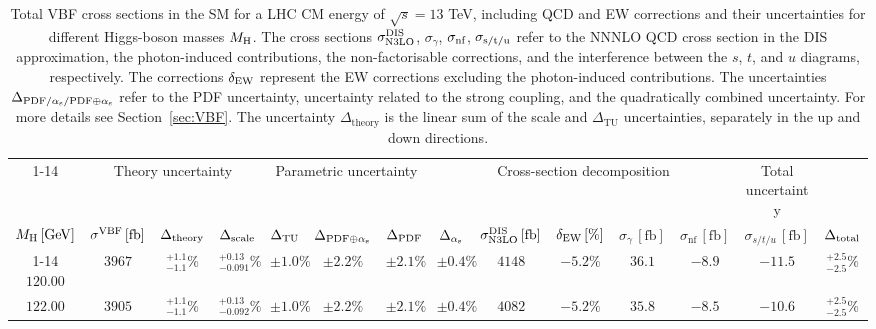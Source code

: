 \begin{landscape}
\begin{table}[ht!]
\caption{Total VBF cross sections in the SM for a LHC CM energy of $\sqrt{s}=13$ TeV, including QCD and EW corrections
and their uncertainties for different Higgs-boson masses \texorpdfstring{$M_\mathrm{H}$}\MH. 
The cross sections $\sigma_{\mathrm{N3LO}}^{\mathrm{DIS}}$, $\sigma_{\gamma}$, $\sigma_{\mbox{\scriptsize nf}}$, $\sigma_{\mbox{\scriptsize s/t/u}}$ refer to the NNNLO QCD cross section in the DIS approximation, the photon-induced contributions, the non-factorisable corrections, and the interference between the $s$, $t$, and $u$ diagrams, respectively.
The corrections $\delta_{\mathrm{EW}}$ represent the EW corrections excluding the photon-induced contributions.
The uncertainties $\Delta_{\mathrm{PDF}/\alpha_{\mathrm{s}}/\mathrm{PDF\oplus\alpha_{\mathrm{s}}}}$ refer to the PDF uncertainty, uncertainty related to the strong coupling, and the quadratically combined uncertainty.
For more details see Section~\ref{sec:VBF}. The uncertainty $\Delta_{\mathrm{theory}}$ is the linear sum of the scale and $\Delta_{\mathrm{TU}}$ uncertainties, separately in the up and down directions.}
\label{tab:vbf_XStot_13}
\centering
\scriptsize
{\renewcommand{\arraystretch}{1.4}
\begin{tabular}{| cc | ccc | ccc | ccc | cc | c |}
\cline{1-14}
\multicolumn{2}{|c|}{\(\sqrt{s} = 13\,\mathrm{TeV}\)} &
\multicolumn{3}{|c|}{Theory uncertainty} &
\multicolumn{3}{|c|}{Parametric uncertainty} &
\multicolumn{5}{|c|}{Cross-section decomposition} &
\multicolumn{1}{c|}{Total uncertainty} \\
\(M_\mathrm{H}\,[\mathrm{GeV}]\) & \(\sigma^{\mathrm{VBF}}\,[\mathrm{fb}]\) &
\(\Delta_{\rm theory}\) &
{\color{black!55}\(\Delta_{\rm scale}\)} & {\color{black!55}\(\Delta_{\rm TU}\)} &
\(\Delta_{\rm PDF\oplus\alpha_{\mathrm{s}}}\) &
{\color{black!55}\(\Delta_{\rm PDF}\)} & {\color{black!55}\(\Delta_{\alpha_{\mathrm{s}}}\)} &
\(\sigma_{\mathrm{N3LO}}^{\mathrm{DIS}}\,[\mathrm{fb}]\) & \(\delta_{\mathrm{EW}}\,[\%]\) & \(\sigma_\gamma\,[\mathrm{fb}]\) & \(\sigma_{\mathrm{nf}}\,[\mathrm{fb}]\) & \(\sigma_{s/t/u}\,[\mathrm{fb}]\) &
\(\Delta_{\rm total}\)
\\
\cline{1-14}
$120.00$ & $3967$ & $^{+1.1}_{-1.1}\%$ & {\color{black!55}$^{+0.13}_{-0.091}\%$} & {\color{black!55}$\pm 1.0\%$} & $\pm 2.2\%$ & {\color{black!55}$\pm 2.1\%$} & {\color{black!55}$\pm 0.4\%$} & $4148$ & $-5.2\%$ & $36.1$ & $-8.9$ & $-11.5$ & $^{+2.5}_{-2.5}\%$ \\
$122.00$ & $3905$ & $^{+1.1}_{-1.1}\%$ & {\color{black!55}$^{+0.13}_{-0.092}\%$} & {\color{black!55}$\pm 1.0\%$} & $\pm 2.2\%$ & {\color{black!55}$\pm 2.1\%$} & {\color{black!55}$\pm 0.4\%$} & $4082$ & $-5.2\%$ & $35.8$ & $-8.5$ & $-10.6$ & $^{+2.5}_{-2.5}\%$ \\

\end{tabular}}
\end{table}
\end{landscape}
